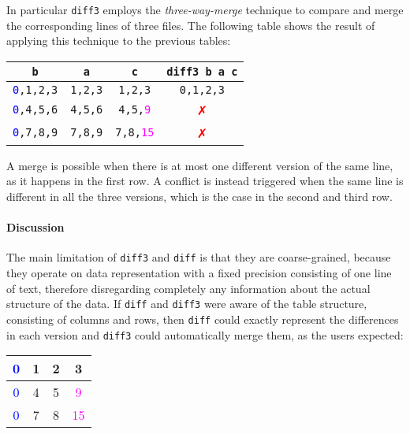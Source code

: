 \documentclass[preprint]{sigplanconf}
\begin{document}
In particular \texttt{diff3} employs the \emph{three-way-merge} technique to compare and merge the corresponding lines of three files. The following table shows the result of applying this technique to the previous tables:
\begin{center}
\begin{tabular}{| c | c | c | c |}
\hline
\texttt{b} & \texttt{a} & \texttt{c} & \texttt{diff3 b a c} \\ \hline
\texttt{\textcolor{blue}{0},1,2,3} & \texttt{1,2,3} & \texttt{1,2,3} & \textcolor{dgreen}{\texttt{0,1,2,3}} \\ \hline
\texttt{\textcolor{blue}{0},4,5,6} & \texttt{4,5,6} & \texttt{4,5,\textcolor{magenta}{9}} & \textcolor{red}{✗}  \\ \hline
\texttt{\textcolor{blue}{0},7,8,9} & \texttt{7,8,9} & \texttt{7,8,\textcolor{magenta}{15}} & \textcolor{red}{✗} \\ \hline
\end{tabular}
\end{center}
A merge is possible when there is at most one different version of the same line, as it happens in the first row.
A conflict is instead triggered when the same line is different in all the three versions, which is the case in the second and third row.


\paragraph{Discussion}
The main limitation of \texttt{diff3} and \texttt{diff} is that they are  coarse-grained, because they operate on data representation with a fixed precision consisting of one line of text, therefore disregarding completely any information about the actual structure of the data.
If \texttt{diff} and \texttt{diff3} were aware of the table structure, consisting of columns and rows, then \texttt{diff} could exactly represent the differences in each version and \texttt{diff3} could automatically merge them, as the users expected:
\begin{center}
\begin{tabular}{| c | c | c | c |}
\hline
\textcolor{blue}{0} & 1 & 2 & 3 \\ \hline
\textcolor{blue}{0} & 4 & 5 & \textcolor{magenta}{9} \\ \hline
\textcolor{blue}{0} & 7 & 8 & \textcolor{magenta}{15} \\ \hline
\end{tabular}
\end{center}
\end{document}
